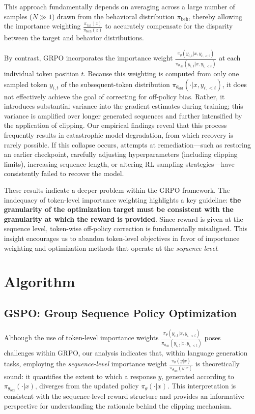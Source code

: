 This approach fundamentally depends on averaging across a large number of samples ($N \gg 1$) drawn from the behavioral distribution $\pi_\text{beh}$, thereby allowing the importance weighting $\frac{ \pi_\text{tar} (z) }{ \pi_\text{beh} (z)}$ to accurately compensate for the disparity between the target and behavior distributions.

By contrast, GRPO incorporates the importance weight $\frac{ \pi_{\theta} (y_{i,t} | x, y_{i,<t}) }{ \pi_{\theta_\text{old}} (y_{i,t} | x,y_{i,<t})}$ at each individual token position $t$. Because this weighting is computed from only one sampled token $y_{i,t}$ of the subsequent-token distribution $\pi_{\theta_\text{old}}( \cdot | x, y_{i,<t})$, it does not effectively achieve the goal of correcting for off-policy bias. Rather, it introduces substantial variance into the gradient estimates during training; this variance is amplified over longer generated sequences and further intensified by the application of clipping. Our empirical findings reveal that this process frequently results in catastrophic model degradation, from which recovery is rarely possible. If this collapse occurs, attempts at remediation—such as restoring an earlier checkpoint, carefully adjusting hyperparameters (including clipping limits), increasing sequence length, or altering RL sampling strategies—have consistently failed to recover the model.

These results indicate a deeper problem within the GRPO framework. The inadequacy of token-level importance weighting highlights a key guideline: \textbf{the granularity of the optimization target must be consistent with the granularity at which the reward is provided}. Since reward is given at the sequence level, token-wise off-policy correction is fundamentally misaligned. This insight encourages us to abandon token-level objectives in favor of importance weighting and optimization methods that operate at the \textit{sequence level}.

\section{Algorithm}

\subsection{GSPO: Group Sequence Policy Optimization}

Although the use of token-level importance weights $\frac{ \pi_{\theta} (y_{i,t} | x, y_{i,<t}) }{ \pi_{\theta_\text{old}} (y_{i,t} | x,y_{i,<t})}$ poses challenges within GRPO, our analysis indicates that, within language generation tasks, employing the \textit{sequence-level} importance weight $\frac{ \pi_{\theta} (y | x) }{ \pi_{\theta_\text{old}} (y | x)}$ is theoretically sound: it quantifies the extent to which a response $y$, generated according to $\pi_{\theta_\text{old}} (\cdot | x)$, diverges from the updated policy $\pi_{\theta} (\cdot | x)$. This interpretation is consistent with the sequence-level reward structure and provides an informative perspective for understanding the rationale behind the clipping mechanism.

